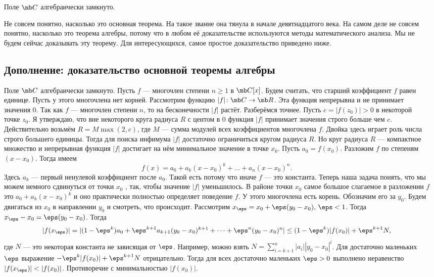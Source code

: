  Поле $\mb C$ алгебраически замкнуто.
\ethrm

Не совсем понятно, насколько это основная теорема. На такое звание она тянула в начале девятнадцатого века. На самом деле не совсем понятно, насколько это теорема алгебры, потому что в любом её доказательстве используются методы математического анализа. Мы не будем сейчас доказывать эту теорему. Для интересующихся, самое простое доказательство приведено ниже. 






\subsection*{Дополнение: доказательство основной теоремы алгебры}

\begin{thmm} Поле $\mb C$ алгебраически замкнуто.
\proof Пусть $f$ — многочлен степени $n\geq 1$ в $\mb C[x]$. Будем считать, что старший коэффициент $f$ равен единице. Пусть у этого многочлена нет корней. Рассмотрим функцию $|f|\colon \mb C \to \mb R$. Эта функция непрерывна и не принимает значения 0. Так как $f$ --- многочлен степени $n$, то на бесконечности $|f|$ растёт. Разберёмся точнее. Пусть
$c = |f(z_0)| > 0$ в некоторой точке $z_0$. Я утверждаю, что вне некоторого круга радиуса $R$ с центом в 0 функция
$|f|$ принимает значения строго больше чем $c$. Действительно возьмём $R= M \max(2,c)$, где $M$ --- сумма модулей всех коэффициентов многочлена $f$. Двойка здесь играет роль числа строго большего единицы.
Тогда для поиска инфимума $|f|$ достаточно ограничиться кругом радиуса $R$. Но круг радиуса $R$ --- компактное множество и непрерывная функция $|f|$ достигает на нём минимальное значение в точке $x_0$. Пусть $a_0 =f(x_0)$. Разложим
$f$ по степеням $(x-x_0)$. Тогда имеем
$$f(x) = a_0 + a_k (x-x_0)^k + \dots + a_n(x -x_0 )^n.$$
Здесь $a_k$ --- первый ненулевой коэффициент после $a_0$. Такой есть потому что иначе $f$ --- это константа. Теперь наша
задача понять, что мы можем немного сдвинуться от точки $x_0$ , так, чтобы значение $|f|$ уменьшилось. В районе точки
$x_0$ самое большое слагаемое в разложении $f$ это $a_0 + a_k (x-x_0)^k$ и оно практически полностью определяет поведение $f$.
У этого многочлена есть корень. Обозначим его за $y_0$. Будем двигаться из $x_0$ в направлении $y_0$ и смотреть, что происходит.
Рассмотрим $x_{\eps} = x_0 + \eps(y_0 -x_0 ), \,\eps < 1$. Тогда $x_{\eps} -x_0 = \eps(y_0 -x_0 )$. Тогда
$$|f(x_{\eps})| = |(1 - \eps^k)a_0 + \eps^{k+1} a_{k+1} (y_0 -x_0)^{k+1} + \dots+ \eps^n(y_0-x_0 )^n | \leq (1- \eps^k )|f(x_0)| + \eps^{k+1}N,$$
где $N$ — это некоторая константа не зависящая от $\eps$. Например, можно взять $N = \sum_{i=k+1}^n |a_i||y_0 -x_0 |^i$. Для достаточно
маленьких $\eps$ выражение $ -\eps^k |f(x_0)| + \eps^{k+1}N$ отрицательно. Тогда для всех достаточно маленьких $\eps>0$ выполнено неравенство $|f(x_{\eps})| < |f(x_0)|$.
Противоречие с минимальностью $|f(x_0)|$. \endproof
\end{thmm}





